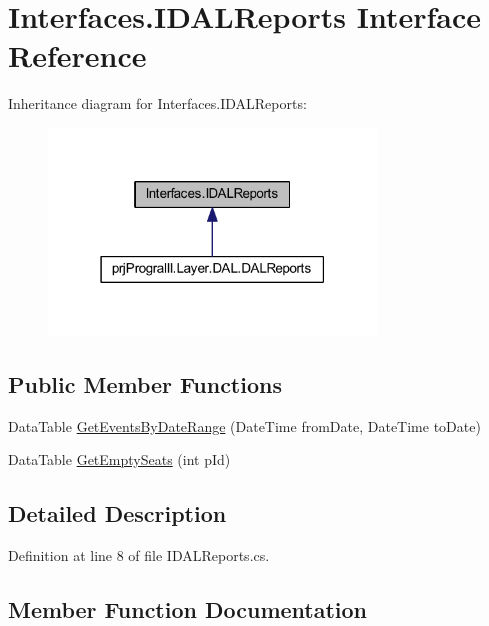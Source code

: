\hypertarget{interface_interfaces_1_1_i_d_a_l_reports}{}\section{Interfaces.\+I\+D\+A\+L\+Reports Interface Reference}
\label{interface_interfaces_1_1_i_d_a_l_reports}


Inheritance diagram for Interfaces.\+I\+D\+A\+L\+Reports\+:
\nopagebreak
\begin{figure}[H]
\begin{center}
\leavevmode
\includegraphics[width=247pt]{interface_interfaces_1_1_i_d_a_l_reports__inherit__graph}
\end{center}
\end{figure}
\subsection*{Public Member Functions}
\begin{DoxyCompactItemize}
\item 
Data\+Table \hyperlink{interface_interfaces_1_1_i_d_a_l_reports_a7cd9a35b355b8b8ae6dfc43b715758af}{Get\+Events\+By\+Date\+Range} (Date\+Time from\+Date, Date\+Time to\+Date)
\item 
Data\+Table \hyperlink{interface_interfaces_1_1_i_d_a_l_reports_aae14fd24724e5b09d6c577805b79262a}{Get\+Empty\+Seats} (int p\+Id)
\end{DoxyCompactItemize}


\subsection{Detailed Description}


Definition at line 8 of file I\+D\+A\+L\+Reports.\+cs.



\subsection{Member Function Documentation}
\hypertarget{interface_interfaces_1_1_i_d_a_l_reports_aae14fd24724e5b09d6c577805b79262a}{}\label{interface_interfaces_1_1_i_d_a_l_reports_aae14fd24724e5b09d6c577805b79262a} 
